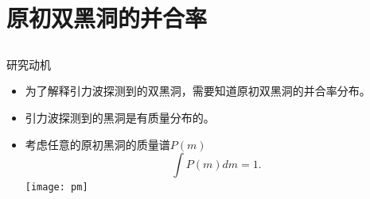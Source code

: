\documentclass[xcolor={svgnames},compress]{beamer}
\let\olditem\item
\renewcommand{\item}{%
    \olditem\vspace{\fill}}
\begin{document}
\section{原初双黑洞的并合率}
\subsection{}
\begin{frame}{研究动机}
    \begin{itemize}
        \item 为了解释引力波探测到的双黑洞，需要知道原初双黑洞的并合率分布。
        \item 引力波探测到的黑洞是有质量分布的。
        \item 考虑任意的原初黑洞的质量谱$P(m)$
        {\small
        \[
        \int P(m)dm=1.
        \]
    }
        \centering
        \texttt{[image: pm]} 
    \end{itemize}
\end{frame}
\end{document}
